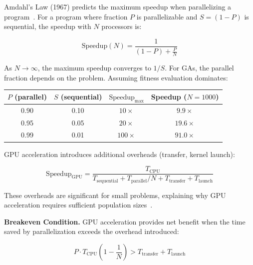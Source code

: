 


Amdahl's Law (1967) predicts the maximum speedup when parallelizing a program~\cite{amdahl1967validity}. For a program where fraction $P$ is parallelizable and $S = (1-P)$ is sequential, the speedup with $N$ processors is:

\begin{equation}
\text{Speedup}(N) = \frac{1}{(1-P) + \frac{P}{N}}
\label{eq:amdahl}
\end{equation}

As $N \rightarrow \infty$, the maximum speedup converges to $1/S$. For GAs, the parallel fraction depends on the problem. Assuming fitness evaluation dominates:

\begin{center}
\begin{tabular}{@{}cccc@{}}
\toprule
$P$ (parallel) & $S$ (sequential) & $\text{Speedup}_{\max}$ & Speedup ($N=1000$) \\
\midrule
0.90 & 0.10 & $10\times$ & $9.9\times$ \\
0.95 & 0.05 & $20\times$ & $19.6\times$ \\
0.99 & 0.01 & $100\times$ & $91.0\times$ \\
\bottomrule
\end{tabular}
\end{center}

GPU acceleration introduces additional overheads (transfer, kernel launch):

\begin{equation}
\text{Speedup}_{\text{GPU}} = \frac{T_{\text{CPU}}}{T_{\text{sequential}} + T_{\text{parallel}}/N + T_{\text{transfer}} + T_{\text{launch}}}
\label{eq:gpu_speedup}
\end{equation}

These overheads are significant for small problems, explaining why GPU acceleration requires sufficient population sizes~\cite{mei2024comprehensive,wang2023gpu}.

\textbf{Breakeven Condition.} GPU acceleration provides net benefit when the time saved by parallelization exceeds the overhead introduced:

\begin{equation}
P \cdot T_{\text{CPU}} \left(1 - \frac{1}{N}\right) > T_{\text{transfer}} + T_{\text{launch}}
\label{eq:breakeven}
\end{equation}

